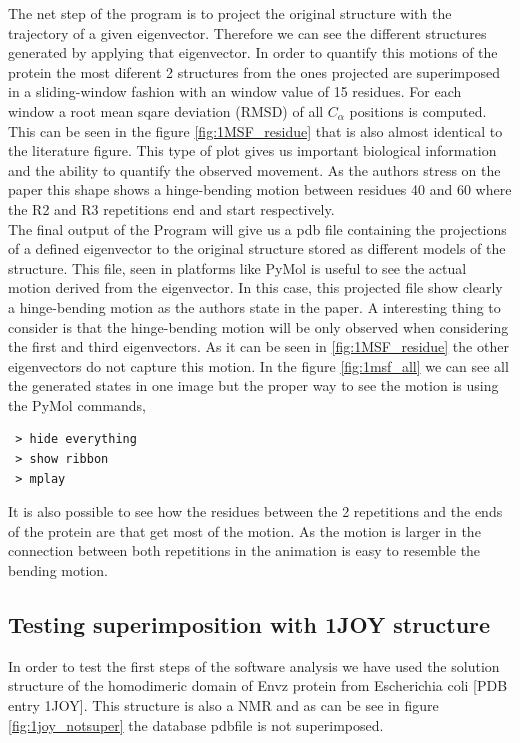 \documentclass[12pt]{article}
\begin{document}
The net step of the program is to project the original structure with the trajectory of a given eigenvector. Therefore we can see the different structures generated by applying that eigenvector. In order to quantify this motions of the protein the most diferent 2 structures from the ones projected are superimposed in a sliding-window fashion with an window value of 15 residues. For each window a root mean sqare deviation (RMSD) of all $C_{\alpha}$ positions is computed. This can be seen in the figure \ref{fig:1MSF_residue} that is also almost identical to the literature figure\citep{VanAalten1998}. This type of plot gives us important biological information and the ability to quantify the observed movement. As the authors stress on the paper\citep{VanAalten1998} this shape shows a hinge-bending motion between residues 40 and 60 where the R2 and R3 repetitions end and start respectively.\\

The final output of the Program will give us a pdb file containing the projections of a defined eigenvector to the original structure stored as different models of the structure. This file, seen in platforms like PyMol\citep{PyMOL} is useful to see the actual motion derived from the eigenvector. In this case, this projected file show clearly a hinge-bending motion as the authors state in the paper. A interesting thing to consider is that the hinge-bending motion will be only observed when considering the first and third eigenvectors. As it can be seen in \ref{fig:1MSF_residue} the other eigenvectors do not capture this motion. In the figure \ref{fig:1msf_all} we can see all the generated states in one image but the proper way to see the motion is using the PyMol commands, 
\begin{lstlisting}
 > hide everything
 > show ribbon 
 > mplay
 \end{lstlisting}
 
It is also possible to see how the residues between the 2 repetitions and the ends of the protein are that get most of the motion. As the motion is larger in the connection between both repetitions in the animation is easy to resemble the bending motion. 





\subsection{Testing superimposition with 1JOY structure}
In order to test the first steps of the software analysis we have used the solution structure of the homodimeric domain of Envz protein from Escherichia coli [PDB entry 1JOY\citep{Tomomori1999}]. This structure is also a NMR and as can be see in figure \ref{fig:1joy_notsuper} the database pdbfile is not superimposed.  
\end{document}
